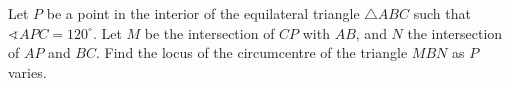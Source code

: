 Let $P$ be a point in the interior of the equilateral triangle $\triangle ABC$ such that $\sphericalangle{APC}=120^\circ$. Let $M$ be the intersection of $CP$ with $AB$,  and $N$ the intersection of $AP$ and $BC$. Find the locus of the circumcentre of the triangle $MBN$ as $P$ varies.